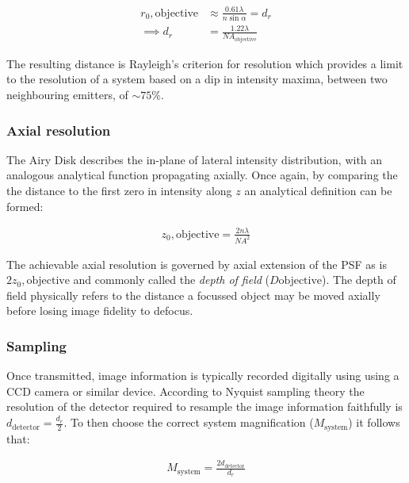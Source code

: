 \begin{align}
    r_0,\text{objective} &\approx \frac{0.61\lambda}{n\sin\alpha} = d_r \\
    \implies d_r &= \frac{1.22 \lambda}{NA_{\text{objective}}}
\end{align}

The resulting distance is Rayleigh's criterion for resolution which provides a limit to the resolution of a system based on a dip in intensity maxima, between two neighbouring emitters, of $\sim 75\%$.

\subsubsection{Axial resolution}

The Airy Disk describes the in-plane of lateral intensity distribution, with an analogous analytical function propagating axially.
Once again, by comparing the the distance to the first zero in intensity along $z$ an analytical definition can be formed:

\begin{align}
    z_0,\text{objective} = \frac{2n\lambda}{NA^2} \label{eq:}
\end{align}

The achievable axial resolution is governed by axial extension of the PSF as is $2z_0,\text{objective}$ and commonly called the \emph{depth of field} ($D\text{objective}$).
The depth of field physically refers to the distance a focussed object may be moved axially before losing image fidelity to defocus.

%
%


\subsubsection{Sampling}

Once transmitted, image information is typically recorded digitally using using a CCD camera or similar device.
According to Nyquist sampling theory the resolution of the detector required to resample the image information faithfully is $d_\text{detector} = \frac{d_r}{2}$.
To then choose the correct system magnification ($M_\text{system}$) it follows that:

\begin{align}
    M_\text{system} = \frac{2d_\text{detector}}{d_r}
\end{align}

